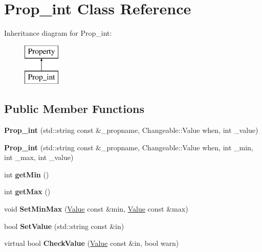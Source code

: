 \hypertarget{classProp__int}{\section{Prop\-\_\-int Class Reference}
\label{classProp__int}
}
Inheritance diagram for Prop\-\_\-int\-:\begin{figure}[H]
\begin{center}
\leavevmode
\includegraphics[height=2.000000cm]{classProp__int}
\end{center}
\end{figure}
\subsection*{Public Member Functions}
\begin{DoxyCompactItemize}
\item 
\hypertarget{classProp__int_ab8c1f3f50ceaf2e36e3aab48253d2250}{{\bfseries Prop\-\_\-int} (std\-::string const \&\-\_\-propname, Changeable\-::\-Value when, int \-\_\-value)}\label{classProp__int_ab8c1f3f50ceaf2e36e3aab48253d2250}

\item 
\hypertarget{classProp__int_ac60562cfca6336553db06cf561819bb7}{{\bfseries Prop\-\_\-int} (std\-::string const \&\-\_\-propname, Changeable\-::\-Value when, int \-\_\-min, int \-\_\-max, int \-\_\-value)}\label{classProp__int_ac60562cfca6336553db06cf561819bb7}

\item 
\hypertarget{classProp__int_aad26bd6a145d1ca391951ae4b15e625d}{int {\bfseries get\-Min} ()}\label{classProp__int_aad26bd6a145d1ca391951ae4b15e625d}

\item 
\hypertarget{classProp__int_ac2c53ae3bfb50553e3dc518c19df83db}{int {\bfseries get\-Max} ()}\label{classProp__int_ac2c53ae3bfb50553e3dc518c19df83db}

\item 
\hypertarget{classProp__int_a5ddfd86051b921d5102fa76649bc145a}{void {\bfseries Set\-Min\-Max} (\hyperlink{classValue}{Value} const \&min, \hyperlink{classValue}{Value} const \&max)}\label{classProp__int_a5ddfd86051b921d5102fa76649bc145a}

\item 
\hypertarget{classProp__int_ad4aa382f6c4d02d5fd465e592ca50fdc}{bool {\bfseries Set\-Value} (std\-::string const \&in)}\label{classProp__int_ad4aa382f6c4d02d5fd465e592ca50fdc}

\item 
\hypertarget{classProp__int_a300bf8b255025d2252f44b104fefe661}{virtual bool {\bfseries Check\-Value} (\hyperlink{classValue}{Value} const \&in, bool warn)}\label{classProp__int_a300bf8b255025d2252f44b104fefe661}

\end{DoxyCompactItemize}


